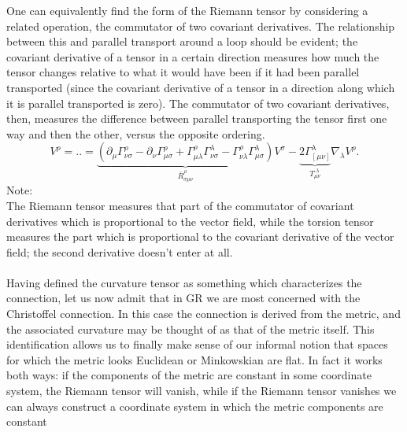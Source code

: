 One can equivalently find the form of the Riemann tensor by considering a related operation, the commutator of two covariant derivatives. The relationship between this and parallel transport around a loop should be evident;
the covariant derivative of a tensor in a certain direction measures how much the tensor
changes relative to what it would have been if it had been parallel transported (since the
covariant derivative of a tensor in a direction along which it is parallel transported is zero).
The commutator of two covariant derivatives, then, measures the difference between parallel
transporting the tensor first one way and then the other, versus the opposite ordering.
\begin{equation}
	[\nabla_\mu, \nabla_\nu] V^\rho = ..= \underbrace{\left(\partial_\mu \Gamma^\rho_{\nu \sigma} - \partial_\nu \Gamma^\rho_{\mu \sigma} + \Gamma^\rho_{\mu \lambda}\Gamma^\lambda_{\nu \sigma} -\Gamma^\rho_{\nu \lambda}\Gamma^\lambda_{\mu \sigma} \right)}_{\bar{R}^\rho_{\sigma \mu \nu}} V^\sigma - \underbrace{2 \Gamma^\lambda_{[\mu \nu]}}_{T^{\,\, \lambda}_{\mu\nu}} \nabla_\lambda V^\rho.
\end{equation}
Note:\\
The Riemann tensor measures that part of
the commutator of covariant derivatives which is proportional to the vector field, while
the torsion tensor measures the part which is proportional to the covariant derivative
of the vector field; the second derivative doesn’t enter at all.\\
\\
Having defined the curvature tensor as something which characterizes the connection, let
us now admit that in GR we are most concerned with the Christoffel connection. In this
case the connection is derived from the metric, and the associated curvature may be thought
of as that of the metric itself. This identification allows us to finally make sense of our
informal notion that spaces for which the metric looks Euclidean or Minkowskian are flat.
In fact it works both ways: if the components of the metric are constant in some coordinate
system, the Riemann tensor will vanish, while if the Riemann tensor vanishes we can always
construct a coordinate system in which the metric components are constant\\
\\
